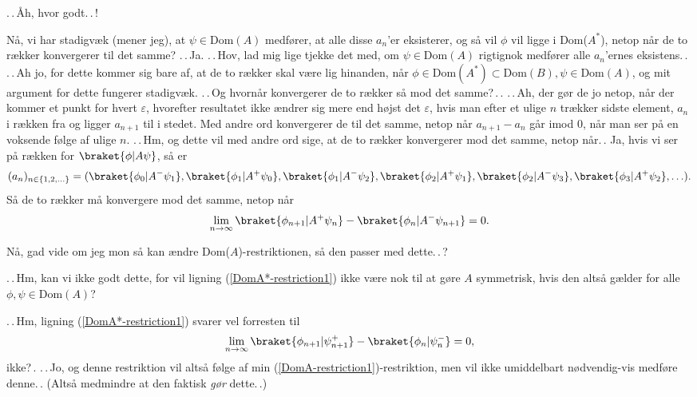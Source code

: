 \documentclass{report}
\begin{document}
.\,.\,Åh, hvor godt.\,.\,!

Nå, vi har stadigvæk (mener jeg), at $\psi\in\mathrm{Dom}(A)$ medfører, at alle disse $a_n$'er eksisterer, og så vil $\phi$ vil ligge i Dom($A^*$), netop når de to rækker konvergerer til det samme? .\,.\,Ja. .\,.\,Hov, lad mig lige tjekke det med, om $\psi\in\mathrm{Dom}(A)$ rigtignok medfører alle $a_n$'ernes eksistens.\,. .\,.\,Ah jo, for dette kommer sig bare af, at de to rækker skal være lig hinanden, når $\phi\in\mathrm{Dom}(A^*)\subset\mathrm{Dom}(B), \psi\in\mathrm{Dom}(A)$, og mit argument for dette fungerer stadigvæk. .\,.\,Og hvornår konvergerer de to rækker så mod det samme?\,.\,. .\,.\,Ah, der gør de jo netop, når der kommer et punkt for hvert $\varepsilon$, hvorefter resultatet ikke ændrer sig mere end højst det $\varepsilon$, hvis man efter et ulige $n$ trækker sidste element, $a_n$ i rækken fra og ligger $a_{n+1}$ til i stedet. Med andre ord konvergerer de til det samme, netop når $a_{n+1} - a_n$ går imod 0, når man ser på en voksende følge af ulige $n$. .\,.\,Hm, og dette vil med andre ord sige, at de to rækker konvergerer mod det samme, netop når.\,. Ja, hvis vi ser på rækken for $\braket{\phi | A \psi}$, så er
\begin{align}
\begin{aligned}
	(a_n)_{n\in\{1, 2, \ldots\}} = 
	(
		\braket{\phi_0 | A^- \psi_1}, 
		\braket{\phi_1 | A^+ \psi_0}, 
		\braket{\phi_1 | A^- \psi_2}, 
		\braket{\phi_2 | A^+ \psi_1}, 
		\braket{\phi_2 | A^- \psi_3}, 
		\braket{\phi_3 | A^+ \psi_2}, 
	\ldots
	).
\end{aligned}
\end{align}
Så de to rækker må konvergere mod det samme, netop når 
\begin{align}
\begin{aligned}
	\lim_{n\to\infty}
		\braket{\phi_{n+1}| A^+ \psi_{n}} -
		\braket{\phi_{n}| A^- \psi_{n+1}}
		= 0.
	\label{DomA*-restriction1}
\end{aligned}
\end{align}

Nå, gad vide om jeg mon så kan ændre Dom($A$)-restriktionen, så den passer med dette.\,.\,? 

.\,.\,Hm, kan vi ikke godt dette, for vil ligning (\ref{DomA*-restriction1}) ikke være nok til at gøre $A$ symmetrisk, hvis den altså gælder for alle $\phi, \psi \in \mathrm{Dom}(A)$? 

.\,.\,Hm, ligning (\ref{DomA*-restriction1}) svarer vel forresten til
\begin{align}
\begin{aligned}
	\lim_{n\to\infty}
		\braket{\phi_{n+1}| \psi_{n+1}^+} - 
		\braket{\phi_{n}| \psi_{n}^-}
		= 0,
	\label{DomA*-restriction2}
\end{aligned}
\end{align}
ikke?\,. .\,.\,Jo, og denne restriktion vil altså følge af min (\ref{DomA-restriction1})-restriktion, men vil ikke umiddelbart nødvendig-vis medføre denne.\,. (Altså medmindre at den faktisk \emph{gør} dette.\,.)
\end{document}
